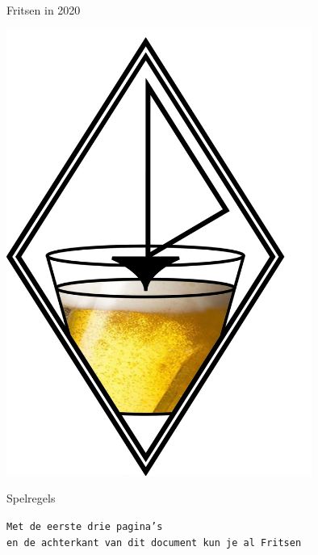 \thispagestyle{empty}
\begingroup
    \fontsize{80pt}{82pt}\selectfont
    \begin{center}
        Fritsen in 2020  
    \end{center}
\endgroup

\vspace{0.55cm}

\begin{center}
    \includegraphics[width=10cm]{bier.jpeg}
\end{center}

\begingroup
    \fontsize{80pt}{82pt}\selectfont
    \begin{center}
        Spelregels  
    \end{center}
\endgroup

\vspace{0.1cm}

\begingroup
    \fontsize{30pt}{32pt}\selectfont
    \begin{center}
        \texttt{Met de eerste drie pagina's \\en de achterkant van dit document kun je al Fritsen}
    \end{center}
\endgroup

\newpage